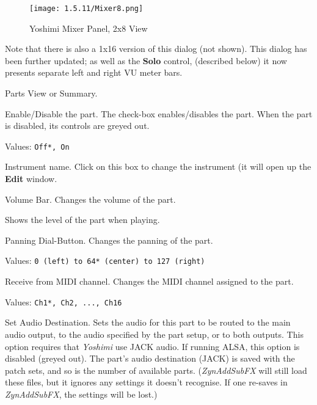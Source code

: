 \begin{figure}[H]
   \centering
   \texttt{[image: 1.5.11/Mixer8.png]}
   \caption[Yoshimi Mixer Panel]{Yoshimi Mixer Panel, 2x8 View}
   \label{fig:yoshimi_part_panel_2x8}
\end{figure}

   Note that there is also a 1x16 version of this dialog (not shown).
   This dialog has been further updated; as well as the \textbf{Solo}
   control, (described below) it now presents separate left and right
   VU meter bars.

   \setcounter{ItemCounter}{0}      %

   Parts View or Summary.

   Enable/Disable the part. The check-box enables/disables the part.
   When the part is disabled, its controls are greyed out.

   Values: \texttt{Off*, On}

   Instrument name. Click on this box to change the instrument (it will
   open up the \textbf{Edit} window.

   Volume Bar.
   Changes the volume of the part.

   Shows the level of the part when playing.

   Panning Dial-Button.
   Changes the panning of the part.

   Values: \texttt{0 (left) to 64* (center) to 127 (right)}

   Receive from MIDI channel.
   Changes the MIDI channel assigned to the part.

   Values: \texttt{Ch1*, Ch2, ..., Ch16}

   Set Audio Destination.
   Sets the audio for this part to be routed to the main audio output, to
   the audio specified by the part setup, or to both outputs.
   This option requires that \textsl{Yoshimi} use JACK audio.  If running
   ALSA, this option is disabled (greyed out).
   The part's audio destination (JACK) is saved with the patch sets, and
   so is the number of available parts.  (\textsl{ZynAddSubFX} will still
   load these files, but it ignores any settings it doesn't recognise. If
   one re-saves in \textsl{ZynAddSubFX}, the settings will be lost.)

